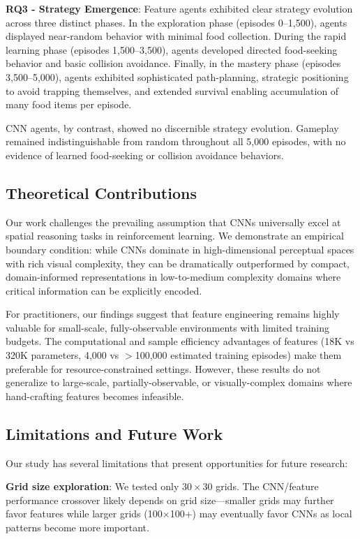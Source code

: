 \documentclass[10pt,a4paper,twocolumn]{article}
\begin{document}
\textbf{RQ3 - Strategy Emergence}: Feature agents exhibited clear strategy evolution across three distinct phases. In the exploration phase (episodes 0--1,500), agents displayed near-random behavior with minimal food collection. During the rapid learning phase (episodes 1,500--3,500), agents developed directed food-seeking behavior and basic collision avoidance. Finally, in the mastery phase (episodes 3,500--5,000), agents exhibited sophisticated path-planning, strategic positioning to avoid trapping themselves, and extended survival enabling accumulation of many food items per episode.

CNN agents, by contrast, showed no discernible strategy evolution. Gameplay remained indistinguishable from random throughout all 5,000 episodes, with no evidence of learned food-seeking or collision avoidance behaviors.

\subsection{Theoretical Contributions}

Our work challenges the prevailing assumption that CNNs universally excel at spatial reasoning tasks in reinforcement learning. We demonstrate an empirical boundary condition: while CNNs dominate in high-dimensional perceptual spaces with rich visual complexity, they can be dramatically outperformed by compact, domain-informed representations in low-to-medium complexity domains where critical information can be explicitly encoded.

For practitioners, our findings suggest that feature engineering remains highly valuable for small-scale, fully-observable environments with limited training budgets. The computational and sample efficiency advantages of features (18K vs 320K parameters, 4,000 vs $>$100,000 estimated training episodes) make them preferable for resource-constrained settings. However, these results do not generalize to large-scale, partially-observable, or visually-complex domains where hand-crafting features becomes infeasible.

\subsection{Limitations and Future Work}

Our study has several limitations that present opportunities for future research:

\textbf{Grid size exploration}: We tested only $30 \times 30$ grids. The CNN/feature performance crossover likely depends on grid size---smaller grids may further favor features while larger grids (100×100+) may eventually favor CNNs as local patterns become more important.
\end{document}
